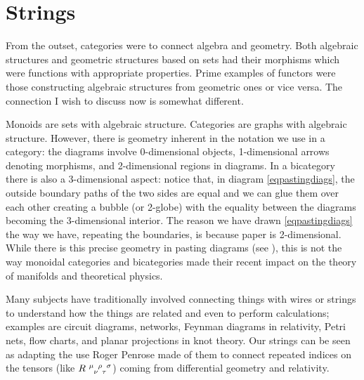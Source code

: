 \documentclass[a4paper,12pt]{article}
\theoremstyle{step}
\begin{document}
\section{Strings}
From the outset, categories were to connect algebra and geometry.
Both algebraic structures and geometric structures based on sets had their morphisms
which were functions with appropriate properties. Prime examples of functors were those
constructing algebraic structures from geometric ones or vice versa. The connection I wish
to discuss now is somewhat different.

Monoids are sets with algebraic structure. Categories are graphs with algebraic structure.
However, there is geometry inherent in the notation we use in a category: the diagrams involve
0-dimensional objects, 1-dimensional arrows denoting morphisms, and 2-dimensional regions in diagrams. In a bicategory there is also a 3-dimensional aspect: notice that, 
in diagram \eqref{eqpastingdiags}, the outside boundary paths of the two sides are equal and we
can glue them over each other creating a bubble (or 2-globe) with the equality between the diagrams
becoming the 3-dimensional interior. The reason we have drawn \eqref{eqpastingdiags} the way we
have, repeating the boundaries, is because paper is 2-dimensional. While there is this precise 
geometry in pasting diagrams (see \cite{Pow}), this is not the way monoidal categories
 and bicategories made their recent impact on the theory of manifolds and theoretical physics.

Many subjects have traditionally involved connecting things with wires or strings to understand
how the things are related and even to perform calculations; examples are circuit diagrams, networks, Feynman diagrams in relativity, Petri nets, flow charts, and planar projections in knot theory.
Our strings can be seen as adapting the use Roger Penrose \cite{Pen1971} made of them to connect 
repeated indices on the tensors (like $\tensor{R \ }{^\mu_\nu^\rho_\tau^\sigma}$) coming from differential geometry and relativity. 
\end{document}
